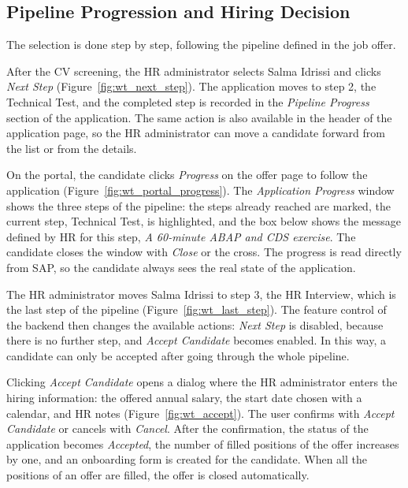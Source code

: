 \subsection{Pipeline Progression and Hiring Decision}
\label{subsec:wt_decision}

The selection is done step by step, following the pipeline defined in the job offer.


After the CV screening, the HR administrator selects Salma Idrissi and clicks \emph{Next Step} (Figure~\ref{fig:wt_next_step}). The application moves to step 2, the Technical Test, and the completed step is recorded in the \emph{Pipeline Progress} section of the application. The same action is also available in the header of the application page, so the HR administrator can move a candidate forward from the list or from the details.


On the portal, the candidate clicks \emph{Progress} on the offer page to follow the application (Figure~\ref{fig:wt_portal_progress}). The \emph{Application Progress} window shows the three steps of the pipeline: the steps already reached are marked, the current step, Technical Test, is highlighted, and the box below shows the message defined by HR for this step, \emph{A 60-minute ABAP and CDS exercise}. The candidate closes the window with \emph{Close} or the cross. The progress is read directly from SAP, so the candidate always sees the real state of the application.


The HR administrator moves Salma Idrissi to step 3, the HR Interview, which is the last step of the pipeline (Figure~\ref{fig:wt_last_step}). The feature control of the backend then changes the available actions: \emph{Next Step} is disabled, because there is no further step, and \emph{Accept Candidate} becomes enabled. In this way, a candidate can only be accepted after going through the whole pipeline.


Clicking \emph{Accept Candidate} opens a dialog where the HR administrator enters the hiring information: the offered annual salary, the start date chosen with a calendar, and HR notes (Figure~\ref{fig:wt_accept}). The user confirms with \emph{Accept Candidate} or cancels with \emph{Cancel}. After the confirmation, the status of the application becomes \emph{Accepted}, the number of filled positions of the offer increases by one, and an onboarding form is created for the candidate. When all the positions of an offer are filled, the offer is closed automatically.

